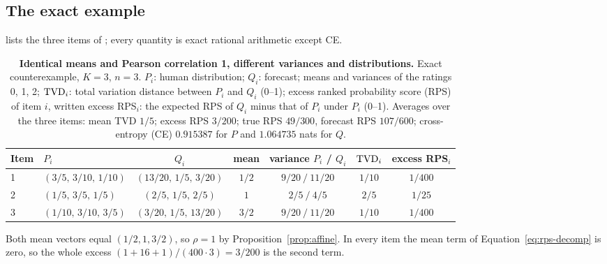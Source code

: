 \subsection{The exact example}
\label{app:example}
 lists the three items of ; every quantity is exact rational arithmetic except CE.
\begin{table}[h]
\caption{\textbf{Identical means and Pearson correlation 1, different variances and distributions.}
Exact counterexample, $K=3$, $n=3$.
$P_i$: human distribution; $Q_i$: forecast; means and variances of the ratings 0, 1, 2; $\mathrm{TVD}_i$: total variation distance between $P_i$ and $Q_i$ (0--1); excess ranked probability score (RPS) of item $i$, written excess RPS$_i$: the expected RPS of $Q_i$ minus that of $P_i$ under $P_i$ (0--1).
Averages over the three items: mean TVD $1/5$; excess RPS $3/200$; true RPS $49/300$, forecast RPS $107/600$; cross-entropy (CE) $0.915387$ for $P$ and $1.064735$ nats for $Q$.}
\label{tab:example}
\centering\small
\begin{tabular}{llccccc}
\toprule
Item & $P_i$ & $Q_i$ & mean & variance $P_i$ / $Q_i$ & $\mathrm{TVD}_i$ & excess RPS$_i$ \\
\midrule
1 & $(3/5,\,3/10,\,1/10)$ & $(13/20,\,1/5,\,3/20)$ & $1/2$ & $9/20\ /\ 11/20$ & $1/10$ & $1/400$ \\
2 & $(1/5,\,3/5,\,1/5)$ & $(2/5,\,1/5,\,2/5)$ & $1$ & $2/5\ /\ 4/5$ & $2/5$ & $1/25$ \\
3 & $(1/10,\,3/10,\,3/5)$ & $(3/20,\,1/5,\,13/20)$ & $3/2$ & $9/20\ /\ 11/20$ & $1/10$ & $1/400$ \\
\bottomrule
\end{tabular}
\end{table}
Both mean vectors equal $(1/2,1,3/2)$, so $\rho=1$ by Proposition~\ref{prop:affine}.
In every item the mean term of Equation~\eqref{eq:rps-decomp} is zero, so the whole excess $(1+16+1)/(400\cdot3)=3/200$ is the second term.

